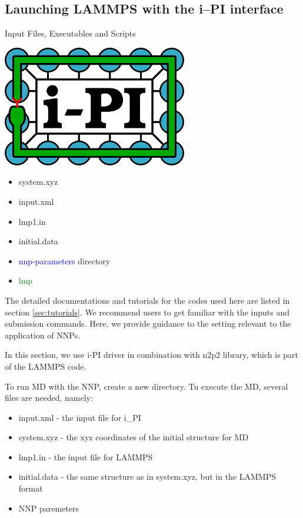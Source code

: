\documentclass[12pt]{article}
\begin{document}
\subsection{Launching LAMMPS with the i--PI interface}
\begin{mybox2}{{Input Files, Executables and Scripts}}
\begin{minipage}[c]{0.5\linewidth}
\includegraphics[scale=0.35]{latex_files/ipi-logo-alpha.png}
\end{minipage}
\begin{minipage}[c]{0.5\linewidth}
\begin{itemize}
    \item system.xyz
    \item input.xml
    \item lmp1.in
    \item initial.data
    \item \textcolor{blue}{nnp-parameters} directory
    \item \textcolor{green}{lmp}
\end{itemize}
\end{minipage}
\end{mybox2}

The detailed documentations and tutorials for the codes used here are listed in section \ref{sec:tutorials}. We recommend users to get familiar with the inputs and submission commands. Here, we provide guidance to the setting relevant to the application of NNPs. 

In this section, we use i-PI driver in combination with n2p2 library, which is part of the LAMMPS code. 

To run MD with the NNP, create a new directory. Tu execute the MD, several files are needed, namely:
\begin{itemize}
\item input.xml - the input file for i\_PI
\item system.xyz - the xyz coordinates of the initial structure for MD
\item lmp1.in - the input file for LAMMPS
\item initial.data - the same structure as in system.xyz, but in the LAMMPS format 
\item NNP paremeters
\end{itemize}
\end{document}

